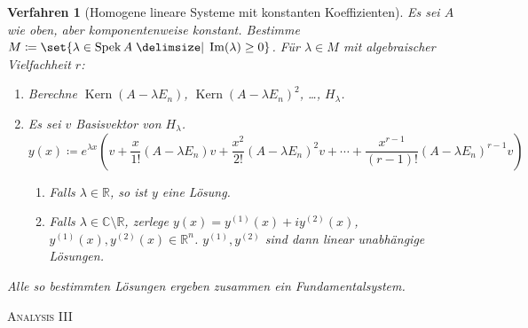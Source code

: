 \documentclass[a4paper]{article}
\theoremstyle{marginbreak}
\newtheorem{verfahren}[definition]{Verfahren}
\DeclareMathOperator{\Spek}{Spek}
\DeclareMathOperator{\Kern}{Kern}
\begin{document}
	\begin{verfahren}[Homogene lineare Systeme mit konstanten Koeffizienten]
		Es sei $A$ wie oben, aber komponentenweise konstant.
		Bestimme $M\coloneqq\set{\lambda\in\Spek A\given \Im(\lambda)\geq 0}$.
		Für $\lambda\in M$ mit algebraischer Vielfachheit $r$:
		\begin{enumerate}
			\item Berechne $\Kern(A-\lambda E_n)$, $\Kern (A-\lambda E_n)^2$, \ldots, $H_\lambda$.
			\item Es sei $v$ Basisvektor von $H_\lambda$.
				\begin{equation*}
					y(x)\coloneqq e^{\lambda x}(v + \frac{x}{1!}(A-\lambda E_n)v + \frac{x^2}{2!}(A-\lambda E_n)^2v
						+\cdots+\frac{x^{r - 1}}{(r - 1)!}(A-\lambda E_n)^{r-1}v)
				\end{equation*}
				\begin{enumerate}[label=(\alph*)]
					\item Falls $\lambda\in\mathbb{R}$, so ist $y$ eine Lösung.
					\item Falls $\lambda\in\mathbb{C}\setminus\mathbb{R}$,
						zerlege $y(x)=y^{(1)}(x) + iy^{(2)}(x)$, $y^{(1)}(x), y^{(2)}(x)\in\mathbb{R}^n$.
						$y^{(1)}, y^{(2)}$ sind dann linear unabhängige Lösungen.
				\end{enumerate}
		\end{enumerate}
		Alle so bestimmten Lösungen ergeben zusammen ein Fundamentalsystem.
	\end{verfahren}
	\newpage
	\textsc{Analysis III}
\end{document}
